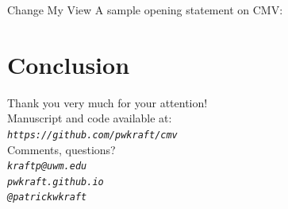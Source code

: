 \documentclass{beamer}
\begin{document}
\begin{frame}{Change My View}\centering
A sample opening statement on CMV:\\
\vspace{1em}
\end{frame}

\section{Conclusion}



\begin{frame}%
\begin{center}
	\large{Thank you very much for your attention!}\\ \vspace{2em}
	Manuscript and code available at:\\
	\emph{\texttt{https://github.com/pwkraft/cmv}}\\ \vspace{2em}
	Comments, questions?\\
	\emph{\faEnvelopeO\hspace{.5em}\texttt{kraftp@uwm.edu}}\\\vspace{2em}
	\emph{\faGlobe\hspace{.5em}\texttt{pwkraft.github.io}}\\
	\emph{\faTwitter\hspace{.5em}\texttt{@patrickwkraft}}\\
\end{center}
\end{frame}


%
\end{document}
